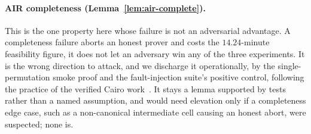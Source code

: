 \paragraph{AIR completeness (Lemma~\ref{lem:air-complete}).}
This is the one property here whose failure is not an adversarial advantage. A completeness failure aborts an honest prover and costs the $14.24$-minute feasibility figure, it does not let an adversary win any of the three experiments. It is the wrong direction to attack, and we discharge it operationally, by the single-permutation smoke proof and the fault-injection suite's positive control, following the practice of the verified Cairo work~\cite{cairoverify}. It stays a lemma supported by tests rather than a named assumption, and would need elevation only if a completeness edge case, such as a non-canonical intermediate cell causing an honest abort, were suspected; none is.


